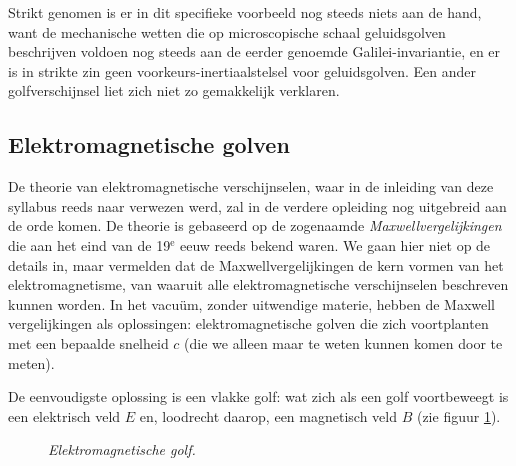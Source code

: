 Strikt genomen is er in dit specifieke voorbeeld nog steeds niets aan
de hand, want de mechanische wetten die op microscopische schaal
geluidsgolven beschrijven voldoen nog steeds aan de eerder genoemde
Galilei-invariantie, en er is in strikte zin geen voorkeurs-inertiaalstelsel voor geluidsgolven. Een ander golfverschijnsel liet
zich niet zo gemakkelijk verklaren.

\subsection{Elektromagnetische golven}
De theorie van elektromagnetische verschijnselen, waar in de inleiding
van deze syllabus reeds naar verwezen werd, zal in de verdere
opleiding nog uitgebreid aan de orde komen.  De theorie is gebaseerd
op de zogenaamde {\sl Maxwellvergelijkingen} die aan het eind van de
19$^{\mathrm{e}}$ eeuw reeds bekend waren.  We gaan hier niet op de details in, maar
vermelden dat de Maxwellvergelijkingen de kern vormen van het
elektromagnetisme, van waaruit alle elektromagnetische verschijnselen
beschreven kunnen worden.  In het vacu\"um, zonder uitwendige materie,
hebben de Maxwell vergelijkingen als oplossingen: elektromagnetische
golven die zich voortplanten met een bepaalde snelheid $c$ (die we
alleen maar te weten kunnen komen door te meten).

De eenvoudigste oplossing is een vlakke golf: wat zich als een golf
voortbeweegt is een elektrisch veld $E$ en, loodrecht daarop, een
magnetisch veld $B$ (zie figuur \ref{f:emgolf1}).


\begin{figure}[ht]
\centering
{}
\caption{{\sl Elektromagnetische golf.}}
\label{f:emgolf1}
\end{figure}

